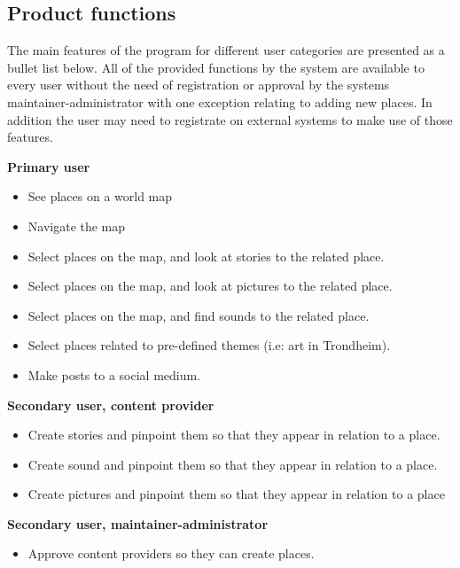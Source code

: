 \noindent

\subsection{Product functions}

The main features of the program for different user categories are presented as a bullet list below. All of the provided functions by the system are available to every user without the need of registration or approval by the systems maintainer-administrator with one exception relating to adding new places. In addition the user may need to registrate on external systems to make use of those features.

\noindent


\begin{description}
\item [\textbf{Primary user}]
\end{description}
\begin{itemize}
\item See places on a world map
\item Navigate the map
\item Select places on the map, and look at stories to the related place. 
\item Select places on the map, and look at pictures to the related place.
\item Select places on the map, and find sounds to the related place.
\item Select places related to pre-defined themes (i.e: art in Trondheim).
\item Make posts to a social medium. 
\end{itemize}
\vspace{0.5cm}
\begin{description}
\item [\textbf{Secondary user, content provider}]
\end{description}
\begin{itemize}
\item Create stories and pinpoint them so that they appear in relation to a place.
\item Create sound and pinpoint them so that they appear in relation to a place.
\item Create pictures and pinpoint them so that they appear in relation to a place
\end{itemize}
\vspace{0.5cm}
\begin{description}
\item [\textbf{Secondary user, maintainer-administrator}]
\end{description}
\begin{itemize}
\item Approve content providers so they can create places.
\end{itemize}

